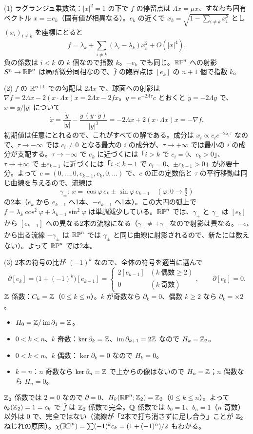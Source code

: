 \begin{solution}
(1) ラグランジュ乗数法：$\lvert x\rvert^2=1$ の下で $f$ の停留点は $\Lambda x=\mu x$、すなわち固有ベクトル $x=\pm e_k$（固有値が相異なる）。$e_k$ の近くで $x_k=\sqrt{1-\sum_{i\neq k}x_i^2}$ とし $(x_i)_{i\neq k}$ を座標にとると
\[
f=\lambda_k+\sum_{i\neq k}(\lambda_i-\lambda_k)x_i^2+O(\lvert x\rvert^4).
\]
負の係数は $i<k$ の $k$ 個なので指数 $k$。$-e_k$ でも同じ。$\mathbb{RP}^n$ への射影 $S^n\to\mathbb{RP}^n$ は局所微分同相なので、$\bar f$ の臨界点は $[e_k]$ の $n+1$ 個で指数 $k$。

(2) $f$ の $\mathbb{R}^{n+1}$ での勾配は $2\Lambda x$ で、球面への射影は $\nabla f=2\Lambda x-2(x\cdot\Lambda x)x=2\Lambda x-2fx$。$y=e^{-2\Lambda\tau}c$ とおくと $\dot y=-2\Lambda y$ で、$x=y/\lvert y\rvert$ について
\[
\dot x=\frac{\dot y}{\lvert y\rvert}-\frac{y\,(y\cdot\dot y)}{\lvert y\rvert^3}=-2\Lambda x+2(x\cdot\Lambda x)x=-\nabla f .
\]
初期値は任意にとれるので、これがすべての解である。成分は $x_i\propto c_ie^{-2\lambda_i\tau}$ なので、$\tau\to-\infty$ では $c_i\neq0$ となる最大の $i$ の成分が、$\tau\to+\infty$ では最小の $i$ の成分が支配する。$\tau\to-\infty$ で $e_k$ に近づくには「$i>k$ で $c_i=0$、$c_k>0$」、$\tau\to+\infty$ で $\pm e_{k-1}$ に近づくには「$i<k-1$ で $c_i=0$、$\pm c_{k-1}>0$」が必要十分。よって $c=(0,\dots,0,c_{k-1},c_k,0,\dots)$ で、$c$ の正の定数倍と $\tau$ の平行移動は同じ曲線を与えるので、流線は
\[
\gamma_\pm:\ x=\cos\varphi\,e_k\pm\sin\varphi\,e_{k-1}\quad(\varphi:0\to\tfrac\pi2)
\]
の2本（$e_k$ から $e_{k-1}$ へ1本、$-e_{k-1}$ へ1本）。この大円の弧上で $f=\lambda_k\cos^2\varphi+\lambda_{k-1}\sin^2\varphi$ は単調減少している。$\mathbb{RP}^n$ では、$\gamma_+$ と $\gamma_-$ は $[e_k]$ から $[e_{k-1}]$ への異なる2本の流線になる（$\gamma_-\neq\pm\gamma_+$ なので射影は異なる。$-e_k$ から出る流線 $-\gamma_\pm$ は $\mathbb{RP}^n$ では $\gamma_\pm$ と同じ曲線に射影されるので、新たには数えない）。よって $\mathbb{RP}^n$ では2本。

(3) 2本の符号の比が $(-1)^k$ なので、全体の符号を適当に選んで
\[
\partial[e_k]=\bigl(1+(-1)^k\bigr)[e_{k-1}]=\begin{cases}2[e_{k-1}]&(k\ \text{偶数}\ge2)\\0&(k\ \text{奇数})\end{cases},\qquad \partial[e_0]=0 .
\]
$\mathbb{Z}$ 係数：$C_k=\mathbb{Z}$（$0\le k\le n$）。$k$ が奇数なら $\partial_k=0$、偶数 $k\ge2$ なら $\partial_k=\times2$。
\begin{itemize}
\item $H_0=\mathbb{Z}/\operatorname{im}\partial_1=\mathbb{Z}$。
\item $0<k<n$、$k$ 奇数：$\ker\partial_k=\mathbb{Z}$、$\operatorname{im}\partial_{k+1}=2\mathbb{Z}$ なので $H_k=\mathbb{Z}_2$。
\item $0<k<n$、$k$ 偶数：$\ker\partial_k=0$ なので $H_k=0$。
\item $k=n$：$n$ 奇数なら $\ker\partial_n=\mathbb{Z}$ で上からの像はないので $H_n=\mathbb{Z}$；$n$ 偶数なら $H_n=0$。
\end{itemize}
$\mathbb{Z}_2$ 係数では $2=0$ なので $\partial=0$、$H_k(\mathbb{RP}^n;\mathbb{Z}_2)=\mathbb{Z}_2$（$0\le k\le n$）。よって $b_k(\mathbb{Z}_2)=1=c_k$ で $\bar f$ は $\mathbb{Z}_2$ 係数で完全。$\mathbb{Q}$ 係数では $b_0=1$、$b_n=1$（$n$ 奇数）以外は $0$ で、完全ではない（流線が「2本で打ち消さずに足し合う」ことが $\mathbb{Z}_2$ ねじれの原因）。$\chi(\mathbb{RP}^n)=\sum(-1)^kc_k=(1+(-1)^n)/2$ もわかる。


\end{solution}
